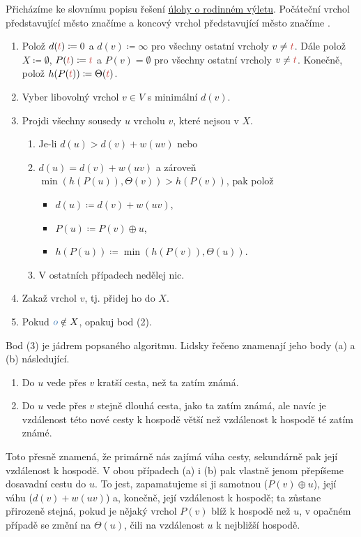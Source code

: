 Přicházíme ke slovnímu popisu řešení \hyperref[prob:rodinny-vylet]{úlohy o
rodinném výletu}. Počáteční vrchol představující město  značíme
 a koncový vrchol představující město  značíme .

\begin{enumerate}
 \item Polož $d(\clr{t}) \coloneqq 0$ a $d(v) \coloneqq \infty$ pro všechny
  ostatní vrcholy $v \neq \clr{t}$. Dále polož $X \coloneqq \emptyset$,
  $P(\clr{t}) \coloneqq \clr{t}$ a $P(v) = \emptyset$ pro všechny ostatní
  vrcholy $v \neq \clr{t}$. Konečně, polož $h(P(\clr{t})) \coloneqq
  \Theta(\clr{t})$.
 \item Vyber libovolný vrchol $v \in V$ s minimální $d(v)$.
 \item Projdi všechny sousedy $u$ vrcholu $v$, které nejsou v $X$.
 \begin{enumerate}
  \item Je-li $d(u) > d(v) + w(uv)$ nebo
  \item $d(u) = d(v) + w(uv)$ a zároveň $\min(h(P(u)),\Theta(v)) >
   h(P(v))$, pak polož
   \begin{itemize}
    \item $d(u) \coloneqq d(v) + w(uv)$,
    \item $P(u) \coloneqq P(v) \oplus u$,
    \item $h(P(u)) \coloneqq \min(h(P(v)), \Theta(u))$.
   \end{itemize}
  \item V ostatních případech nedělej nic.
 \end{enumerate}
 \item Zakaž vrchol $v$, tj. přidej ho do $X$.
 \item Pokud $\clb{o} \notin X$, opakuj bod (2).
\end{enumerate}

\begin{remark}
 Bod (3) je jádrem popsaného algoritmu. Lidsky řečeno znamenají jeho body (a) a
 (b) následující.
 \begin{enumerate}[label=(\alph*)]
  \item Do $u$ vede přes $v$ kratší cesta, než ta zatím známá.
  \item Do $u$ vede přes $v$ stejně dlouhá cesta, jako ta zatím známá, ale navíc
   je vzdálenost této nové cesty k hospodě větší než vzdálenost k hospodě té
   zatím známé.
 \end{enumerate}
 Toto přesně znamená, že primárně nás zajímá váha cesty, sekundárně pak její
 vzdálenost k hospodě. V obou případech (a) i (b) pak vlastně jenom přepíšeme
 dosavadní cestu do $u$. To jest, zapamatujeme si ji samotnou ($P(v) \oplus u$),
 její váhu ($d(v) + w(uv)$) a, konečně, její vzdálenost k hospodě; ta zůstane
 přirozeně stejná, pokud je nějaký vrchol $P(v)$ blíž k hospodě než $u$, v
 opačném případě se změní na $\Theta(u)$, čili na vzdálenost $u$ k nejbližší
 hospodě.
\end{remark}

